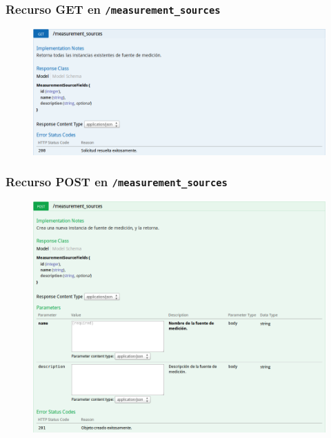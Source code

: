 \newpage


\subsubsection{Recurso GET en \texttt{/measurement\_sources}}

\begin{figure}[h]
  \centering
  \includegraphics[width=\textwidth,height=.75\textheight,keepaspectratio]{img/especificacion_api/measurementSourceList_get}
  \label{measurementSourceList_get}
\end{figure}

\newpage


\subsubsection{Recurso POST en \texttt{/measurement\_sources}}

\begin{figure}[h]
  \centering
  \includegraphics[width=\textwidth,height=.75\textheight,keepaspectratio]{img/especificacion_api/measurementSourceList_post}
  \label{measurementSourceList_post}
\end{figure}

